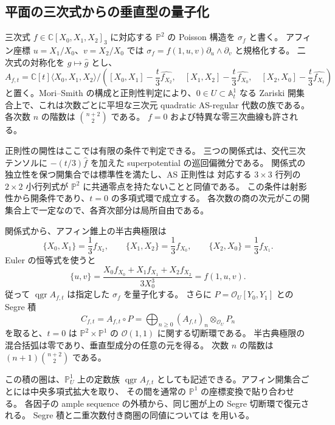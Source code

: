 \subsection{平面の三次式からの垂直型の量子化}
\label{subsec:quant-plane}

三次式 $f\in\mathbb C[X_0,X_1,X_2]_3$ に対応する
$\mathbb P^2$ の Poisson 構造を $\sigma_f$ と書く。
アフィン座標 $u=X_1/X_0$、$v=X_2/X_0$ では
$\sigma_f=f(1,u,v)\partial_u\wedge\partial_v$ と規格化する。
二次式の対称化を $g\mapsto\widehat g$ とし、
\[
 A_{f,t}=\mathbb C[t]\langle X_0,X_1,X_2\rangle\Big/
 \left(
 [X_0,X_1]-\frac t3\widehat{f_{X_2}},\quad
 [X_1,X_2]-\frac t3\widehat{f_{X_0}},\quad
 [X_2,X_0]-\frac t3\widehat{f_{X_1}}
 \right)
 \tag{E1}
\]
と置く。Mori--Smith \cite[\S1.7.3、定理1.4、\S1.8.2]{MoriSmith}
の構成と正則性判定により、$0\in U\subset\mathbb A^1_t$ なる
Zariski 開集合上で、これは次数ごとに平坦な三次元 quadratic AS-regular
代数の族である。各次数 $n$ の階数は $\binom{n+2}{2}$ である。
$f=0$ および特異な零三次曲線も許される。

正則性の開性はここでは有限の条件で判定できる。
三つの関係式は、交代三次テンソルに $-(t/3)\widehat f$ を加えた
superpotential の巡回偏微分である。
関係式の独立性を保つ開集合では標準性を満たし、AS 正則性は
対応する $3\times3$ 行列の $2\times2$ 小行列式が
$\mathbb P^2$ に共通零点を持たないことと同値である。
この条件は射影性から開条件であり、$t=0$ の多項式環で成立する。
各次数の商の次元がこの開集合上で一定なので、各斉次部分は局所自由である。

関係式から、アフィン錐上の半古典極限は
\[
 \{X_0,X_1\}=\frac13 f_{X_2},\qquad
 \{X_1,X_2\}=\frac13 f_{X_0},\qquad
 \{X_2,X_0\}=\frac13 f_{X_1}.
\]
Euler の恒等式を使うと
\[
 \{u,v\}
 =\frac{X_0 f_{X_0}+X_1f_{X_1}+X_2f_{X_2}}{3X_0^3}
 =f(1,u,v).
\]
従って $\operatorname{qgr}A_{f,t}$ は指定した $\sigma_f$ を量子化する。
さらに $P=\mathcal O_U[Y_0,Y_1]$ との Segre 積
\[
 C_{f,t}=A_{f,t}\mathbin{\circ}P
   =\bigoplus_{n\geq0}(A_{f,t})_n\otimes_{\mathcal O_U}P_n
 \tag{E2}
\]
を取ると、$t=0$ は $\mathbb P^2\times\mathbb P^1$ の
$\mathcal O(1,1)$ に関する切断環である。
半古典極限の混合括弧は零であり、垂直型成分の任意の元を得る。
次数 $n$ の階数は $(n+1)\binom{n+2}{2}$ である。

この積の圏は、$\mathbb P^1_U$ 上の定数族 $\operatorname{qgr}A_{f,t}$
としても記述できる。アフィン開集合ごとには中央多項式拡大を取り、
その間を通常の $\mathbb P^1$ の座標変換で貼り合わせる。
各因子の ample sequence の外積から、同じ圏が上の Segre 切断環で復元される。
Segre 積と二重次数付き商圏の同値については
\cite[\S3.2、定理3.32]{BallardFarman} を用いる。

